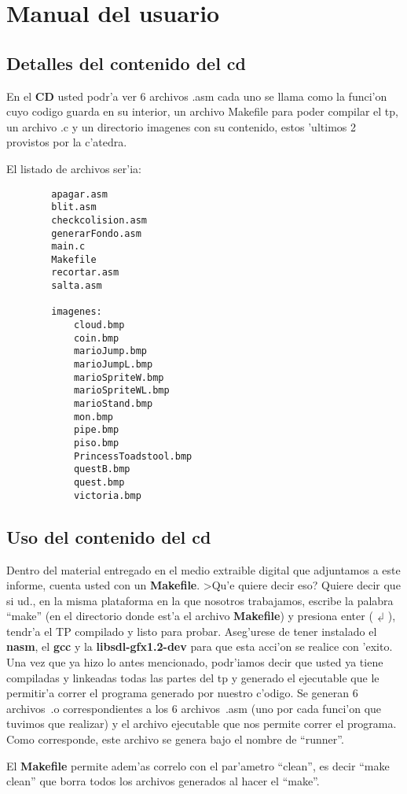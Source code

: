 \section{Manual del usuario}

\subsection{Detalles del contenido del cd}

	En el \textbf{CD} usted podr'a ver 6 archivos .asm cada uno se llama como
la funci'on cuyo codigo guarda en su interior, un archivo Makefile para poder
compilar el tp, un archivo .c y un directorio imagenes con su contenido, estos
'ultimos 2 provistos por la c'atedra.

	El listado de archivos ser'ia:
\begin{verbatim}
		apagar.asm
		blit.asm
		checkcolision.asm
		generarFondo.asm
		main.c
		Makefile
		recortar.asm
		salta.asm

		imagenes:
			cloud.bmp
			coin.bmp
			marioJump.bmp
			marioJumpL.bmp
			marioSpriteW.bmp
			marioSpriteWL.bmp
			marioStand.bmp
			mon.bmp
			pipe.bmp
			piso.bmp
			PrincessToadstool.bmp
			questB.bmp
			quest.bmp
			victoria.bmp
\end{verbatim}

\subsection{Uso del contenido del cd}
	Dentro del material entregado en el medio extraible digital que adjuntamos
a este informe, cuenta usted con un \textbf{Makefile}. >Qu'e quiere decir eso? Quiere
decir que si ud., en la misma plataforma en la que nosotros trabajamos, escribe
la palabra ``make'' (en el directorio donde est'a el archivo \textbf{Makefile})
y presiona enter ($\dlsh$), tendr'a el TP compilado y listo para probar.
Aseg'urese de tener instalado el \textbf{nasm}, el \textbf{gcc} y la
\textbf{libsdl-gfx1.2-dev} para que esta acci'on se realice con 'exito. Una vez
que ya hizo lo antes mencionado, podr'iamos decir que usted ya tiene compiladas
y linkeadas todas las partes del tp y generado el ejecutable que le permitir'a
correr el programa generado por nuestro c'odigo. Se generan 6 archivos~.o
correspondientes a los 6 archivos~.asm (uno por cada funci'on que tuvimos que
realizar) y el archivo ejecutable que nos permite correr el programa. Como
corresponde, este archivo se genera bajo el nombre de ``runner''.

	El \textbf{Makefile} permite adem'as correlo con el par'ametro ``clean'',
es decir ``make clean'' que borra todos los archivos generados al hacer el
``make''.

